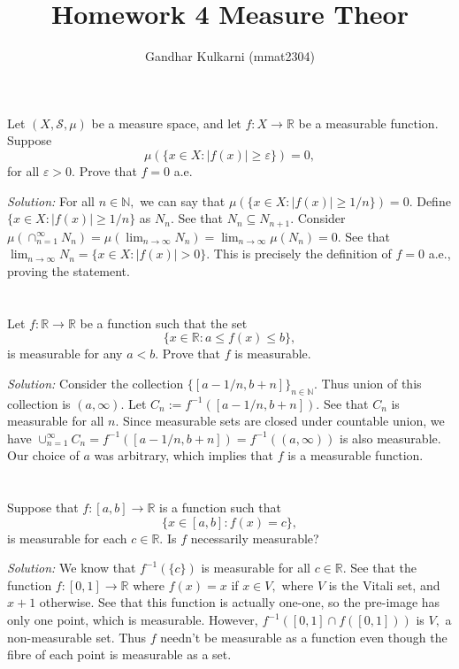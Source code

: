 \documentclass{article}
\title{Homework 4 Measure Theor} %
\author{Gandhar Kulkarni (mmat2304)} %
\date{} %
\begin{document}
\maketitle %
\section{} %
Let $(X, \mathcal{S}, \mu)$ be a measure space, and let $f:X \rightarrow \mathbb{R}$ be a measurable function. Suppose $$\mu(\{x \in X: |f(x)|\geq \varepsilon\})=0, $$ for all $\varepsilon>0.$ Prove that $f=0$ a.e.

\emph{Solution:} For all $n \in  \mathbb{N},$ we can say that $\mu(\{x \in X: |f(x)|\geq 1/n\})=0.$ Define $\{x \in X: |f(x)|\geq 1/n\}$ as $N_n.$
See that $N_n \subseteq N_{n+1}.$ Consider $\mu(\cap_{n=1}^{\infty}N_n)=\mu(\lim_{n \to \infty}N_n)=\lim_{n \to \infty} \mu(N_n)=0.$ See that $\lim_{n \to \infty}N_n=\{x \in X: |f(x)| >0\}.$
This is precisely the definition of $f=0$ a.e., proving the statement. 
\section{} %
Let $f:\mathbb{R} \rightarrow \mathbb{R}$ be a function such that the set $$\{x \in \mathbb{R}: a \leq f(x) \leq b\}, $$
is measurable for any $a<b.$ Prove that $f$ is measurable.

\emph{Solution:} Consider the collection $\{[a-1/n,b+n]\}_{n \in \mathbb{N}}.$ Thus union of this collection is $(a,\infty).$ Let $C_n:= f^{-1}([a-1/n,b+n]).$
See that $C_n$ is measurable for all $n.$ Since measurable sets are closed under countable union, we have $\cup_{n=1}^{\infty}C_n=f^{-1}([a-1/n,b+n])=f^{-1}((a,\infty))$ is 
also measurable. Our choice of $a$ was arbitrary, which implies that $f$ is a measurable function. 
\section{} %
Suppose that $f:[a,b]\rightarrow \mathbb{R}$ is a function such that 
$$\{x \in [a,b]: f(x)=c \}, $$ is measurable for each $c \in \mathbb{R}.$ Is $f$ necessarily measurable?

\emph{Solution:} We know that $f^{-1}(\{c\})$ is measurable for all $c \in \mathbb{R}.$ See that the function $f:[0,1]\rightarrow \mathbb{R}$
where $f(x)=x$ if $x \in V,$ where $V$ is the Vitali set, and $x+1$ otherwise. See that this function is actually one-one, so the pre-image has only one point, which is measurable.
However, $f^{-1}([0,1]\cap f([0,1]))$ is $V,$ a non-measurable set. Thus $f$ needn't be measurable as a function even though the fibre of each point is measurable as a set.
\end{document}
